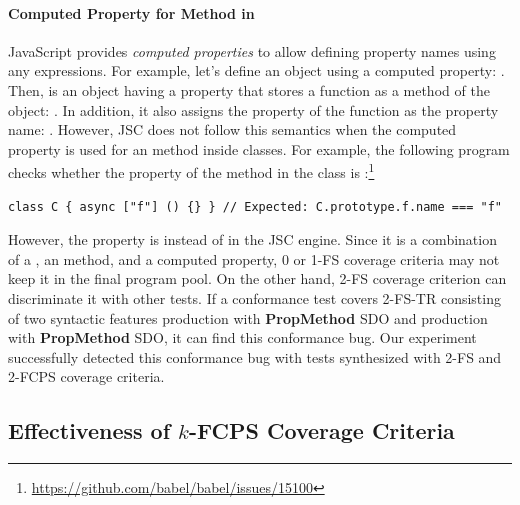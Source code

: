 \paragraph{\textbf{Computed Property for  Method in
}}
%
JavaScript provides \textit{computed properties} to
allow defining property names using any expressions.
%
For example, let's define an object using a computed property: .
%
Then,  is an object having a property  that stores a
function as a method of the object: .
%
In addition, it also assigns the  property of the function as the
property name: .
%
However, JSC does not follow this semantics when the computed property
is used for an  method inside classes.
%
For example, the following program checks whether the  property of
the  method in the class  is :\footnote{
  \url{https://github.com/babel/babel/issues/15100}
}
%
\begin{lstlisting}[style=JS, basicstyle=\footnotesize\ttfamily]
    class C { async ["f"] () {} } // Expected: C.prototype.f.name === "f"
\end{lstlisting}
%
However, the  property is  instead of 
in the JSC engine.
%
Since it is a combination of a , an  method, and a
computed property, 0 or 1-FS coverage criteria may not keep it in the final
program pool.
On the other hand, 2-FS coverage criterion can discriminate it with other tests.
%
If a conformance test covers 2-FS-TR consisting of two syntactic features
 production with \textbf{PropMethod} SDO and
 production with \textbf{PropMethod} SDO,
it can find this conformance bug.
Our experiment successfully detected this conformance bug with tests synthesized
with 2-FS and 2-FCPS coverage criteria.


\subsection{Effectiveness of $k$-FCPS Coverage Criteria}\label{sec:impact-k-fcps}

